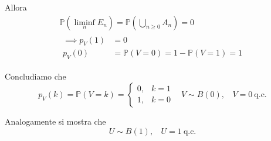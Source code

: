 \begin{enumerate}
Allora\begin{gather*}
\mathbb{P}\left(\liminf _{n} E_{n}\right) =\mathbb{P}\left(\bigcup _{n\geq 0} A_{n}\right) =0\\
\begin{aligned}
\implies p_{V}( 1) & =0\\
p_{V}( 0) & =\mathbb{P}( V=0) =1-\mathbb{P}( V=1) =1
\end{aligned}
\end{gather*}

Concludiamo che\begin{equation*}
p_{V}\left( k\right) =\mathbb{P}\left( V=k\right) =\begin{cases}
0, & k=1\\
1, & k=0
\end{cases} \ \ \ \ V\sim B\left( 0\right) ,\ \ \ \ V=0\ \text{q.c.}
\end{equation*}

Analogamente si mostra che\begin{equation*}
U\sim B( 1) ,\ \ \ \ U=1\ \text{q.c.}
\end{equation*}
\end{enumerate}
